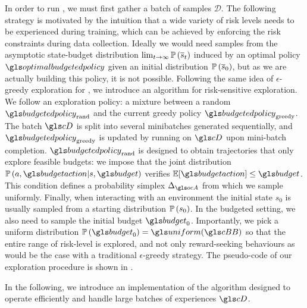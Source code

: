 In order to run , we must first gather a batch of samples $\mathcal{D}$. The following strategy is motivated by the intuition that a wide variety of risk levels needs to be experienced during training, which can be achieved by enforcing the risk constraints during data collection. Ideally we would need samples from the asymptotic state-budget distribution $\lim_{t\rightarrow\infty}\mathbb{P}\left(\overline{s}_t\right)$ induced by an optimal policy $\optimalbudgetedpolicy$ given an initial distribution $\mathbb{P}\left(\overline{s}_0\right)$, but as we are actually building this policy, it is not possible. Following the same idea of $\epsilon$-greedy exploration for \FTQ, we introduce an algorithm for risk-sensitive exploration. We follow an exploration policy: a mixture between a random  $\budgetedpolicy_\text{rand}$ and the current greedy policy $\budgetedpolicy_\text{greedy}$. The batch $\cD$ is split into several minibatches generated sequentially, and $\budgetedpolicy_\text{greedy}$ is updated by running  on $\cD$ upon mini-batch completion. $\budgetedpolicy_\text{rand}$ is designed to obtain trajectories that only explore feasible budgets: we impose that the joint distribution $\probability{a, \budgetaction|s, \budget}$ verifies $\expectedvalue[\budgetaction]\leq\budget$. This condition defines a probability simplex $\Delta_{\ocA}$ from which we sample uniformly. Finally, when interacting with an environment the initial state $s_0$ is usually sampled from a starting distribution $\mathbb{P}\left(s_0\right)$. In the budgeted setting, we also need to sample the initial budget $\budget_0$. Importantly, we pick a uniform distribution $\probability{\budget_0} = \uniform(\budgetspace)$ so that the entire range of risk-level is explored, and not only reward-seeking behaviours as would be the case with a traditional  $\epsilon$-greedy strategy. The pseudo-code of our exploration procedure is shown in .%






In the following, we introduce an implementation of the \BFTQ algorithm designed to operate efficiently and handle large batches of experiences $\cD$.

